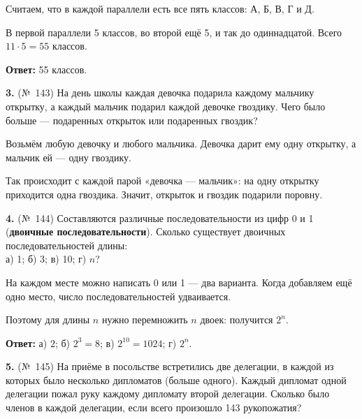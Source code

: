 \begin{solution}\label{solution-combinatorics-rules-homework-2}
Считаем, что в каждой параллели есть все пять классов: А, Б, В, Г и Д.

В первой параллели 5 классов, во второй ещё 5, и так до одиннадцатой. Всего $11\cdot5=55$ классов.

\textbf{Ответ:} 55 классов.
\end{solution}

\begin{task}\label{task-homework-3}
\textbf{3.} (№ 143) На день школы каждая девочка подарила каждому мальчику открытку, а каждый мальчик подарил каждой девочке гвоздику. Чего было больше — подаренных открыток или подаренных гвоздик?
\end{task}

\begin{solution}\label{solution-combinatorics-rules-homework-3}
Возьмём любую девочку и любого мальчика. Девочка дарит ему одну открытку, а мальчик ей — одну гвоздику.

Так происходит с каждой парой «девочка — мальчик»: на одну открытку приходится одна гвоздика. Значит, открыток и гвоздик подарили поровну.
\end{solution}

\begin{task}\label{task-homework-4}
\textbf{4.} (№ 144) Составляются различные последовательности из цифр 0 и 1 (\textbf{двоичные последовательности}). Сколько существует двоичных последовательностей длины:\\
а) 1;    б) 3;    в) 10;    г) \(n\)?
\end{task}

\begin{solution}\label{solution-combinatorics-rules-homework-4}
На каждом месте можно написать 0 или 1 — два варианта. Когда добавляем ещё одно место, число последовательностей удваивается.

Поэтому для длины $n$ нужно перемножить $n$ двоек: получится $2^n$.

\textbf{Ответ:} а) $2$; б) $2^3=8$; в) $2^{10}=1024$; г) $2^n$.
\end{solution}

\begin{task}\label{task-homework-5}
\textbf{5.} (№ 145) На приёме в посольстве встретились две делегации, в каждой из которых было несколько дипломатов (больше одного). Каждый дипломат одной делегации пожал руку каждому дипломату второй делегации. Сколько было членов в каждой делегации, если всего произошло 143 рукопожатия?
\end{task}

